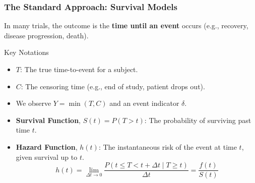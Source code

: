 \documentclass{beamer}
\begin{document}
\begin{frame}
\frametitle{The Standard Approach: Survival Models}
In many trials, the outcome is the \textbf{time until an event} occurs (e.g., recovery, disease progression, death).

\begin{block}{Key Notations}
\begin{itemize}
    \item $T$: The true time-to-event for a subject.
    \item $C$: The censoring time (e.g., end of study, patient drops out).
    \item We observe $Y = \min(T, C)$ and an event indicator $\delta$.
    \item \textbf{Survival Function}, $S(t) = P(T > t)$: The probability of surviving past time $t$.
    \item \textbf{Hazard Function}, $h(t)$: The instantaneous risk of the event at time $t$, given survival up to $t$.
    $$h(t) = \lim_{\Delta t \to 0} \frac{P(t \le T < t + \Delta t \mid T \ge t)}{\Delta t} = \frac{f(t)}{S(t)}$$
\end{itemize}
\end{block}
\end{frame}
\end{document}
